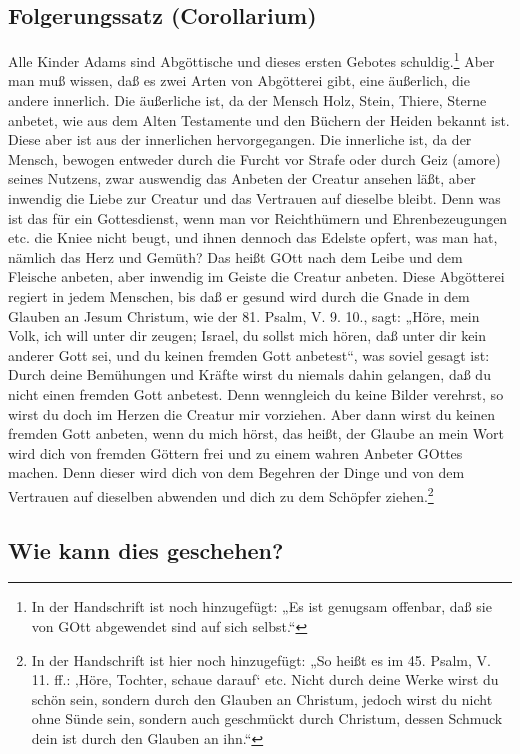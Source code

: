 \subsection{Folgerungssatz (Corollarium)}

Alle Kinder Adams sind Abgöttische und dieses ersten Gebotes schuldig.\footnote{In der Handschrift ist noch hinzugefügt: „Es ist genugsam offenbar, daß sie von GOtt abgewendet sind auf sich selbst.“} Aber man muß wissen, daß es zwei Arten von Abgötterei gibt, eine äußerlich, die andere innerlich. Die äußerliche ist, da der Mensch Holz, Stein, Thiere, Sterne anbetet, wie aus dem Alten Testamente und den Büchern der Heiden bekannt ist. Diese aber ist aus der innerlichen hervorgegangen. Die innerliche ist, da der Mensch, bewogen entweder durch die Furcht vor Strafe oder durch Geiz (amore) seines Nutzens, zwar auswendig das Anbeten der Creatur ansehen läßt, aber inwendig die Liebe zur Creatur und das Vertrauen auf dieselbe bleibt. Denn was ist das für ein Gottesdienst, wenn man vor Reichthümern und Ehrenbezeugungen etc. die Kniee nicht beugt, und ihnen dennoch das Edelste opfert, was man hat, nämlich das Herz und Gemüth? Das heißt GOtt nach dem Leibe und dem Fleische anbeten, aber inwendig im Geiste die Creatur anbeten. Diese Abgötterei regiert in jedem Menschen, bis daß er gesund wird durch die Gnade in dem Glauben an Jesum Christum, wie der 81. Psalm, V. 9. 10., sagt: „Höre, mein Volk, ich will unter dir zeugen; Israel, du sollst mich hören, daß unter dir kein anderer Gott sei, und du keinen fremden Gott anbetest“, was soviel gesagt ist: Durch deine Bemühungen und Kräfte wirst du niemals dahin gelangen, daß du nicht einen fremden Gott anbetest. Denn wenngleich du keine Bilder verehrst, so wirst du doch im Herzen die Creatur mir vorziehen. Aber dann wirst du keinen fremden Gott anbeten, wenn du mich hörst, das heißt, der Glaube an mein Wort wird dich von fremden Göttern frei und zu einem wahren Anbeter GOttes machen. Denn dieser wird dich von dem Begehren der Dinge und von dem Vertrauen auf dieselben abwenden und dich zu dem Schöpfer ziehen.\footnote{In der Handschrift ist hier noch hinzugefügt: „So heißt es im 45. Psalm, V. 11. ff.: ‚Höre, Tochter, schaue darauf‘ etc. Nicht durch deine Werke wirst du schön sein, sondern durch den Glauben an Christum, jedoch wirst du nicht ohne Sünde sein, sondern auch geschmückt durch Christum, dessen Schmuck dein ist durch den Glauben an ihn.“}

\subsection{Wie kann dies geschehen?}

